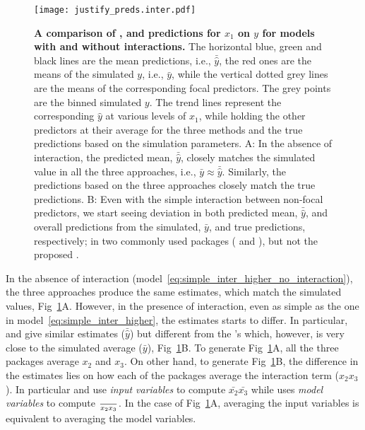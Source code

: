 \begin{figure}[h]
\begin{center}
\texttt{[image: justify\_preds.inter.pdf]}
\end{center}
\caption{{\bf A comparison of ,  and  predictions for $x_1$ on $y$ for models with and without interactions.}
The horizontal blue, green and black lines are the mean predictions, i.e., $\bar{\hat{y}}$, the red ones are the means of the simulated $y$, i.e., $\bar{y}$, while the vertical dotted grey lines are the means of the corresponding focal predictors. The grey points are the binned simulated $y$. The trend lines represent the corresponding $\hat{y}$ at various levels of $x_1$, while holding the other predictors at their average for the three methods and the true predictions based on the simulation parameters. A: In the absence of interaction, the predicted mean, $\bar{\hat{y}}$, closely matches the simulated value in all the three approaches, i.e., $\bar{y} \approx \bar{\hat{y}}$. Similarly, the predictions based on the three approaches closely match the true predictions. B: Even with the simple interaction between non-focal predictors, we start seeing deviation in both predicted mean, $\bar{\hat{y}}$, and overall predictions from the simulated, $\bar{y}$, and true predictions, respectively; in two commonly used packages ( and ), but not the proposed .}
\label{fig:justify_plots}
\end{figure}
%
In the absence of interaction (model~\ref{eq:simple_inter_higher_no_interaction}), the three approaches produce the same estimates, which match the simulated values, Fig~\ref{fig:justify_plots}A. However, in the presence of interaction, even as simple as the one in model~\ref{eq:simple_inter_higher}, the estimates starts to differ. In particular,  and  give similar estimates ($\bar{\hat{y}}$) but different from the 's which, however, is very close to the simulated average ($\bar{y}$), Fig~\ref{fig:justify_plots}B. To generate Fig~\ref{fig:justify_plots}A, all the three packages average $x_2$ and $x_3$. On other hand, to generate Fig~\ref{fig:justify_plots}B, the difference in the estimates lies on how each of the packages average the interaction term ($x_2x_3$). In particular  and  use \emph{input variables} to compute $\bar{x_2}\bar{x_3}$ while  uses \emph{model variables} to compute $\over{x_2x_3}$. In the case of Fig~\ref{fig:justify_plots}A, averaging the input variables is equivalent to averaging the model variables.

